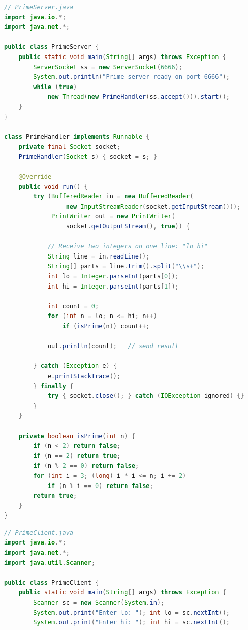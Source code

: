 \documentclass[12pt,a3paper]{article}
\begin{document}
\begin{enumerate}
\begin{tcolorbox}[enhanced,breakable,ansbox,
  colback=cB!4,colframe=cB,boxrule=0.8pt,arc=5pt,
  title={\textbf{Answer — Prime-Count Server: Multi-Client
  TCP}},
  fonttitle=\bfseries\color{white},colbacktitle=cB]
\begin{lstlisting}[language=Java]
// PrimeServer.java
import java.io.*;
import java.net.*;

public class PrimeServer {
    public static void main(String[] args) throws Exception {
        ServerSocket ss = new ServerSocket(6666);
        System.out.println("Prime server ready on port 6666");
        while (true)
            new Thread(new PrimeHandler(ss.accept())).start();
    }
}

class PrimeHandler implements Runnable {
    private final Socket socket;
    PrimeHandler(Socket s) { socket = s; }

    @Override
    public void run() {
        try (BufferedReader in = new BufferedReader(
                 new InputStreamReader(socket.getInputStream()));
             PrintWriter out = new PrintWriter(
                 socket.getOutputStream(), true)) {

            // Receive two integers on one line: "lo hi"
            String line = in.readLine();
            String[] parts = line.trim().split("\\s+");
            int lo = Integer.parseInt(parts[0]);
            int hi = Integer.parseInt(parts[1]);

            int count = 0;
            for (int n = lo; n <= hi; n++)
                if (isPrime(n)) count++;

            out.println(count);   // send result

        } catch (Exception e) {
            e.printStackTrace();
        } finally {
            try { socket.close(); } catch (IOException ignored) {}
        }
    }

    private boolean isPrime(int n) {
        if (n < 2) return false;
        if (n == 2) return true;
        if (n % 2 == 0) return false;
        for (int i = 3; (long) i * i <= n; i += 2)
            if (n % i == 0) return false;
        return true;
    }
}
\end{lstlisting}

\begin{lstlisting}[language=Java]
// PrimeClient.java
import java.io.*;
import java.net.*;
import java.util.Scanner;

public class PrimeClient {
    public static void main(String[] args) throws Exception {
        Scanner sc = new Scanner(System.in);
        System.out.print("Enter lo: "); int lo = sc.nextInt();
        System.out.print("Enter hi: "); int hi = sc.nextInt();


\end{lstlisting}
\end{tcolorbox}
\end{enumerate}
\end{document}
